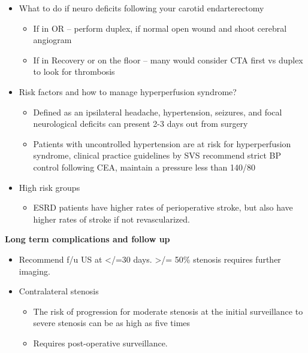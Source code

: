 \documentclass[
]{book}
\providecommand{\tightlist}{%
  \setlength{\itemsep}{0pt}\setlength{\parskip}{0pt}}
\begin{document}
\begin{itemize}
\item
  What to do if neuro deficits following your carotid endarterectomy

  \begin{itemize}
  \item
    If in OR -- perform duplex, if normal open wound and shoot
    cerebral angiogram
  \item
    If in Recovery or on the floor -- many would consider CTA first
    vs duplex to look for thrombosis
  \end{itemize}
\item
  Risk factors and how to manage hyperperfusion syndrome?

  \begin{itemize}
  \item
    Defined as an ipsilateral headache, hypertension, seizures, and
    focal neurological deficits can present 2-3 days out from
    surgery
  \item
    Patients with uncontrolled hypertension are at risk for
    hyperperfusion syndrome, clinical practice guidelines by SVS
    recommend strict BP control following CEA, maintain a pressure
    less than 140/80
  \end{itemize}
\item
  High risk groups

  \begin{itemize}
  \tightlist
  \item
    ESRD patients have higher rates of perioperative stroke, but
    also have higher rates of stroke if not revascularized.
    \citet{klarinPerioperativeLongtermImpact2016}
  \end{itemize}
\end{itemize}

\textbf{Long term complications and follow up}

\begin{itemize}
\item
  Recommend f/u US at \textless/=30 days. \textgreater/= 50\% stenosis requires further
  imaging.
\item
  Contralateral stenosis

  \begin{itemize}
  \item
    The risk of progression for moderate stenosis at the initial
    surveillance to severe stenosis can be as high as five times
  \item
    Requires post-operative surveillance.
  \end{itemize}
\end{itemize}
\end{document}

